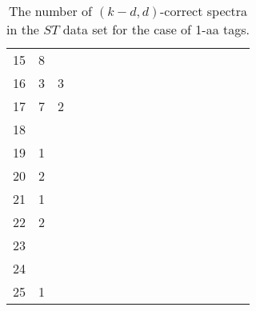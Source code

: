 \documentclass{article}[12pt]
\begin{document}
\begin{landscape}
\begin{table}[h]
{\begin{tabular}{|c|c|
c|c|c|c|c|c|c|c|c|c|c|c|c|c|c|}
15  & 8 &  &  &  &  &  &  &  &  &  &  &  &  &  &  & \\

16  & 3 & 3 &  &  &  &  &  &  &  &  &  &  &  &  &  & \\

17  & 7 & 2 &  &  &  &  &  &  &  &  &  &  &  &  &  & \\

18  &  &  &  &  &  &  &  &  &  &  &  &  &  &  &  & \\

19  & 1 &  &  &  &  &  &  &  &  &  &  &  &  &  &  & \\

20  & 2 &  &  &  &  &  &  &  &  &  &  &  &  &  &  & \\

21  & 1 &  &  &  &  &  &  &  &  &  &  &  &  &  &  & \\

22  & 2 &  &  &  &  &  &  &  &  &  &  &  &  &  &  & \\

23  &  &  &  &  &  &  &  &  &  &  &  &  &  &  &  & \\

24  &  &  &  &  &  &  &  &  &  &  &  &  &  &  &  & \\

25  & 1 &  &  &  &  &  &  &  &  &  &  &  &  &  &  & \\

  \hline
\end{tabular}
\par}
\centering
\caption{The number of $(k-d,d)$-correct spectra in the $ST$ data set for the case of 1-aa tags.}
\vspace{3mm}
\label{table:kd-1-correct-ST}
\end{table}
\end{landscape}
\end{document}
